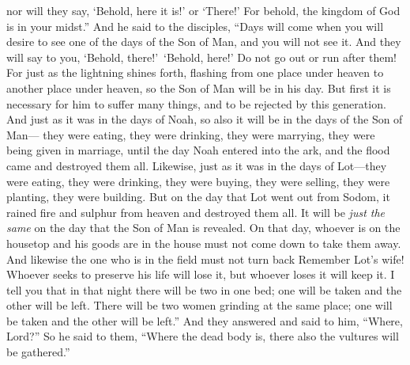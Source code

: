 \begin{biblechapter}
\verse nor will they say, ‘Behold, here it is!’ or ‘There!’ For behold, the kingdom of God is in your midst.”
 And he said to the disciples, “Days will come when you will desire to see one of the days of the Son of Man, and you will not see it.
\verse And they will say to you, ‘Behold, there!’ ‘Behold, here!’ Do not go out or run after them!
\verse For just as the lightning shines forth, flashing from one place under heaven to another place under heaven, so the Son of Man will be in his day.
\verse But first it is necessary for him to suffer many things, and to be rejected by this generation.
\verse And just as it was in the days of Noah, so also it will be in the days of the Son of Man—
\verse they were eating, they were drinking, they were marrying, they were being given in marriage, until the day Noah entered into the ark, and the flood came and destroyed them all.
\verse Likewise, just as it was in the days of Lot—they were eating, they were drinking, they were buying, they were selling, they were planting, they were building.
\verse But on the day that Lot went out from Sodom, it rained fire and sulphur from heaven and destroyed them all.
\verse It will be \textit{just the same} on the day that the Son of Man is revealed.
\verse On that day, whoever is on the housetop and his goods are in the house must not come down to take them away. And likewise the one who is in the field must not turn back
\verse Remember Lot’s wife!
\verse Whoever seeks to preserve his life will lose it, but whoever loses it will keep it.
\verse I tell you that in that night there will be two in one bed; one will be taken and the other will be left.
\verse There will be two women grinding at the same place; one will be taken and the other will be left.”
\verse And they answered and said to him, “Where, Lord?” So he said to them, “Where the dead body is, there also the vultures will be gathered.”
\end{biblechapter}

